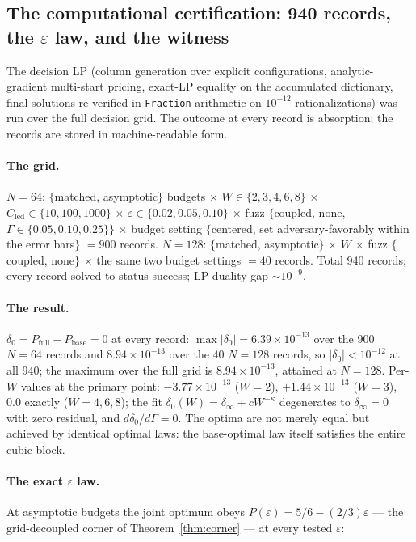 \documentclass[11pt]{article}
\theoremstyle{plain}
\theoremstyle{definition}
\theoremstyle{remark}
\newcommand{\Cled}{C_{\mathrm{led}}}
\begin{document}
\subsection[The computational certification: 940 records, the epsilon law, and
the witness]{The computational certification: 940 records, the $\varepsilon$
law, and the witness}
\label{sec:certification}

The decision LP (column generation over explicit configurations, analytic-gradient
multi-start pricing, exact-LP equality on the accumulated dictionary, final
solutions re-verified in \texttt{Fraction} arithmetic on $10^{-12}$
rationalizations) was run over the full decision grid. The outcome at every
record is absorption; the records are stored in machine-readable form.

\paragraph{The grid.}
$N = 64$: $\{$matched, asymptotic$\}$ budgets $\times$
$W \in \{2, 3, 4, 6, 8\}$ $\times$ $\Cled \in \{10, 100, 1000\}$ $\times$
$\varepsilon \in \{0.02, 0.05, 0.10\}$ $\times$ fuzz $\{$coupled, none,
$\Gamma \in \{0.05, 0.10, 0.25\}\}$ $\times$ budget setting $\{$centered, set
adversary-favorably within the error bars$\}$ $= 900$
records. $N = 128$: $\{$matched, asymptotic$\}$ $\times$ $W$ $\times$ fuzz
$\{$coupled, none$\}$ $\times$ the same two budget settings $= 40$ records.
Total 940 records; every record solved to status success; LP duality gap
${\sim}10^{-9}$.

\paragraph{The result.}
$\delta_0 = P_{\mathrm{full}} - P_{\mathrm{base}} = 0$ at every record:
$\max |\delta_0| = 6.39 \times 10^{-13}$ over the $900$ $N = 64$ records and
$8.94 \times 10^{-13}$ over the $40$ $N = 128$ records, so
$|\delta_0| < 10^{-12}$ at all $940$; the maximum over the full grid is
$8.94 \times 10^{-13}$, attained at $N = 128$. Per-$W$ values at the
primary point: $-3.77 \times 10^{-13}$ ($W = 2$), $+1.44 \times 10^{-13}$
($W = 3$), $0.0$ exactly ($W = 4, 6, 8$); the fit
$\delta_0(W) = \delta_\infty + c W^{-\kappa}$ degenerates to
$\delta_\infty = 0$ with zero residual, and $d\delta_0/d\Gamma = 0$. The optima
are not merely equal but achieved by identical optimal laws: the base-optimal law
itself satisfies the entire cubic block.

\paragraph{The exact $\varepsilon$ law.}
At asymptotic budgets the joint optimum obeys
$P(\varepsilon) = 5/6 - (2/3)\varepsilon$ --- the grid-decoupled corner of
Theorem~\ref{thm:corner} --- at every tested $\varepsilon$:
\end{document}
